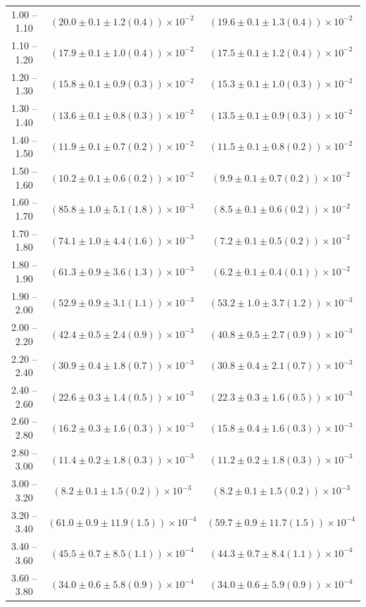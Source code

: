 \begin{table}
\begin{center}
\begin{tabular}{ c | c c }
1.00 -- 1.10 & $(20.0\pm0.1\pm1.2(0.4))\times10^{-2}$ & $(19.6\pm0.1\pm1.3(0.4))\times10^{-2}$ \\ 
1.10 -- 1.20 & $(17.9\pm0.1\pm1.0(0.4))\times10^{-2}$ & $(17.5\pm0.1\pm1.2(0.4))\times10^{-2}$ \\ 
1.20 -- 1.30 & $(15.8\pm0.1\pm0.9(0.3))\times10^{-2}$ & $(15.3\pm0.1\pm1.0(0.3))\times10^{-2}$ \\ 
1.30 -- 1.40 & $(13.6\pm0.1\pm0.8(0.3))\times10^{-2}$ & $(13.5\pm0.1\pm0.9(0.3))\times10^{-2}$ \\ 
1.40 -- 1.50 & $(11.9\pm0.1\pm0.7(0.2))\times10^{-2}$ & $(11.5\pm0.1\pm0.8(0.2))\times10^{-2}$ \\ 
1.50 -- 1.60 & $(10.2\pm0.1\pm0.6(0.2))\times10^{-2}$ & $(9.9\pm0.1\pm0.7(0.2))\times10^{-2}$ \\ 
1.60 -- 1.70 & $(85.8\pm1.0\pm5.1(1.8))\times10^{-3}$ & $(8.5\pm0.1\pm0.6(0.2))\times10^{-2}$ \\ 
1.70 -- 1.80 & $(74.1\pm1.0\pm4.4(1.6))\times10^{-3}$ & $(7.2\pm0.1\pm0.5(0.2))\times10^{-2}$ \\ 
1.80 -- 1.90 & $(61.3\pm0.9\pm3.6(1.3))\times10^{-3}$ & $(6.2\pm0.1\pm0.4(0.1))\times10^{-2}$ \\ 
1.90 -- 2.00 & $(52.9\pm0.9\pm3.1(1.1))\times10^{-3}$ & $(53.2\pm1.0\pm3.7(1.2))\times10^{-3}$ \\ 
2.00 -- 2.20 & $(42.4\pm0.5\pm2.4(0.9))\times10^{-3}$ & $(40.8\pm0.5\pm2.7(0.9))\times10^{-3}$ \\ 
2.20 -- 2.40 & $(30.9\pm0.4\pm1.8(0.7))\times10^{-3}$ & $(30.8\pm0.4\pm2.1(0.7))\times10^{-3}$ \\ 
2.40 -- 2.60 & $(22.6\pm0.3\pm1.4(0.5))\times10^{-3}$ & $(22.3\pm0.3\pm1.6(0.5))\times10^{-3}$ \\ 
2.60 -- 2.80 & $(16.2\pm0.3\pm1.6(0.3))\times10^{-3}$ & $(15.8\pm0.4\pm1.6(0.3))\times10^{-3}$ \\ 
2.80 -- 3.00 & $(11.4\pm0.2\pm1.8(0.3))\times10^{-3}$ & $(11.2\pm0.2\pm1.8(0.3))\times10^{-3}$ \\ 
3.00 -- 3.20 & $(8.2\pm0.1\pm1.5(0.2))\times10^{-3}$ & $(8.2\pm0.1\pm1.5(0.2))\times10^{-3}$ \\ 
3.20 -- 3.40 & $(61.0\pm0.9\pm11.9(1.5))\times10^{-4}$ & $(59.7\pm0.9\pm11.7(1.5))\times10^{-4}$ \\ 
3.40 -- 3.60 & $(45.5\pm0.7\pm8.5(1.1))\times10^{-4}$ & $(44.3\pm0.7\pm8.4(1.1))\times10^{-4}$ \\ 
3.60 -- 3.80 & $(34.0\pm0.6\pm5.8(0.9))\times10^{-4}$ & $(34.0\pm0.6\pm5.9(0.9))\times10^{-4}$ \\ 

\end{tabular}
\end{center}
\end{table}
